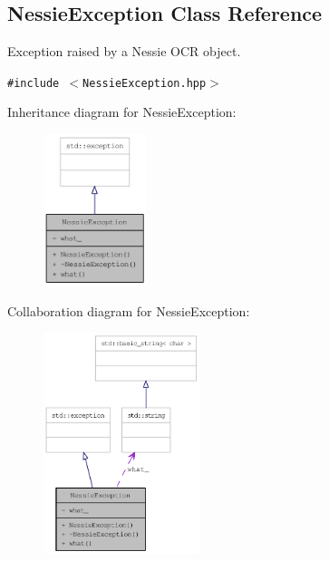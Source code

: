 \hypertarget{class_nessie_exception}{
\subsection{NessieException Class Reference}
\label{class_nessie_exception}
}
Exception raised by a Nessie OCR object.  


{\tt \#include $<$NessieException.hpp$>$}

Inheritance diagram for NessieException:\nopagebreak
\begin{figure}[H]
\begin{center}
\leavevmode
\includegraphics[width=85pt]{class_nessie_exception__inherit__graph}
\end{center}
\end{figure}
Collaboration diagram for NessieException:\nopagebreak
\begin{figure}[H]
\begin{center}
\leavevmode
\includegraphics[width=129pt]{class_nessie_exception__coll__graph}
\end{center}
\end{figure}
